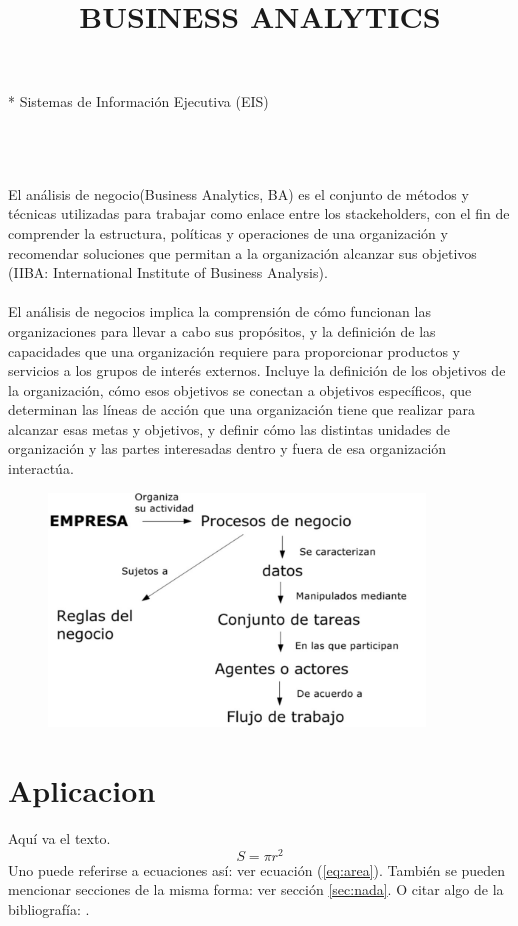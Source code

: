 *  Sistemas de Información Ejecutiva (EIS)
\\\\
\title{BUSINESS ANALYTICS}\\\\
El análisis de negocio(Business Analytics, BA) es el conjunto de métodos y técnicas utilizadas para trabajar como enlace entre los stackeholders, con el fin de comprender la estructura, políticas y operaciones de una organización y recomendar soluciones que permitan a la organización alcanzar sus objetivos (IIBA: International Institute of Business Analysis).\\\\
El análisis de negocios implica la comprensión de cómo funcionan las organizaciones para llevar a cabo sus propósitos, y la definición de las capacidades que una organización requiere para proporcionar productos y servicios a los grupos de interés externos. Incluye la definición de los objetivos de la organización, cómo esos objetivos se conectan a objetivos específicos, que determinan las líneas de acción que una organización tiene que realizar para alcanzar esas metas y objetivos, y definir cómo las distintas unidades de organización y las partes interesadas dentro y fuera de esa organización interactúa.

\begin{figure}[htb]
\begin{center}
\includegraphics[width=10cm]{./Imagenes/anegocios}
\end{center}
\end{figure}

\section{Aplicacion}

Aquí va el texto.
\begin{equation}\label{eq:area}
  S = \pi r^2
\end{equation}
Uno puede referirse a ecuaciones así: ver ecuación (\ref{eq:area}).
También se pueden mencionar secciones de la misma forma: ver sección
\ref{sec:nada}. O citar algo de la bibliografía: \cite{Cd94}.



